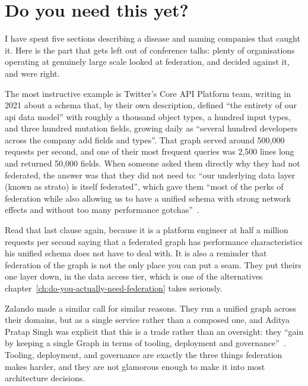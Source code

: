 \section{Do you need this yet?}
\label{sec:ch01-do-you-need-this}

I have spent five sections describing a disease and naming companies that
caught it. Here is the part that gets left out of conference talks: plenty of
organisations operating at genuinely large scale looked at federation, and
decided against it, and were right.

%
The most instructive example is Twitter's Core API Platform team, writing in
2021 about a schema that, by their own description, defined \enquote{the
entirety of our api data model} with roughly a thousand object types, a hundred
input types, and three hundred mutation fields, growing daily as \enquote{several
hundred developers across the company add fields and types}. That graph served
around 500,000 requests per second, and one of their most frequent queries was
2,500 lines long and returned 50,000 fields. When someone asked them directly
why they had not federated, the answer was that they did not need to:
\enquote{our underlying data layer (known as strato) is itself federated}, which
gave them \enquote{most of the perks of federation while also allowing us to
have a unified schema with strong network effects and without too many
performance gotchas}~\autocite{twitter2021unified}.

Read that last clause again, because it is a platform engineer at half a million
requests per second saying that a federated graph has performance
characteristics his unified schema does not have to deal with. It is also a
reminder that federation of the graph is not the only place you can put a seam.
They put theirs one layer down, in the data access tier, which is one of the
alternatives chapter~\ref{ch:do-you-actually-need-federation} takes seriously.

Zalando made a similar call for similar reasons. They run a unified graph across
their domains, but as a single service rather than a composed one, and Aditya
Pratap Singh was explicit that this is a trade rather than an oversight: they
\enquote{gain by keeping a single Graph in terms of tooling, deployment and
governance}~\autocite{singh2021zalando}. Tooling, deployment, and governance are
exactly the three things federation makes harder, and they are not glamorous
enough to make it into most architecture decisions.

